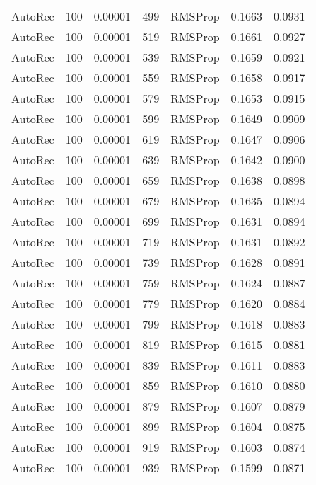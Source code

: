 \begin{tabular}{llrllrr}
 AutoRec &  100 &  0.00001 &   499 &   RMSProp &  0.1663 &       0.0931 \\
 AutoRec &  100 &  0.00001 &   519 &   RMSProp &  0.1661 &       0.0927 \\
 AutoRec &  100 &  0.00001 &   539 &   RMSProp &  0.1659 &       0.0921 \\
 AutoRec &  100 &  0.00001 &   559 &   RMSProp &  0.1658 &       0.0917 \\
 AutoRec &  100 &  0.00001 &   579 &   RMSProp &  0.1653 &       0.0915 \\
 AutoRec &  100 &  0.00001 &   599 &   RMSProp &  0.1649 &       0.0909 \\
 AutoRec &  100 &  0.00001 &   619 &   RMSProp &  0.1647 &       0.0906 \\
 AutoRec &  100 &  0.00001 &   639 &   RMSProp &  0.1642 &       0.0900 \\
 AutoRec &  100 &  0.00001 &   659 &   RMSProp &  0.1638 &       0.0898 \\
 AutoRec &  100 &  0.00001 &   679 &   RMSProp &  0.1635 &       0.0894 \\
 AutoRec &  100 &  0.00001 &   699 &   RMSProp &  0.1631 &       0.0894 \\
 AutoRec &  100 &  0.00001 &   719 &   RMSProp &  0.1631 &       0.0892 \\
 AutoRec &  100 &  0.00001 &   739 &   RMSProp &  0.1628 &       0.0891 \\
 AutoRec &  100 &  0.00001 &   759 &   RMSProp &  0.1624 &       0.0887 \\
 AutoRec &  100 &  0.00001 &   779 &   RMSProp &  0.1620 &       0.0884 \\
 AutoRec &  100 &  0.00001 &   799 &   RMSProp &  0.1618 &       0.0883 \\
 AutoRec &  100 &  0.00001 &   819 &   RMSProp &  0.1615 &       0.0881 \\
 AutoRec &  100 &  0.00001 &   839 &   RMSProp &  0.1611 &       0.0883 \\
 AutoRec &  100 &  0.00001 &   859 &   RMSProp &  0.1610 &       0.0880 \\
 AutoRec &  100 &  0.00001 &   879 &   RMSProp &  0.1607 &       0.0879 \\
 AutoRec &  100 &  0.00001 &   899 &   RMSProp &  0.1604 &       0.0875 \\
 AutoRec &  100 &  0.00001 &   919 &   RMSProp &  0.1603 &       0.0874 \\
 AutoRec &  100 &  0.00001 &   939 &   RMSProp &  0.1599 &       0.0871 \\

\end{tabular}
